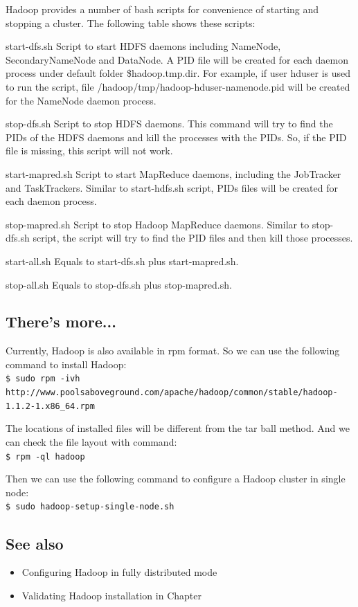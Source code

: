Hadoop provides a number of bash scripts for convenience of starting and stopping a cluster. The following table shows these scripts:
\begin{description}
    \item{start-dfs.sh} Script to start HDFS daemons including NameNode, SecondaryNameNode and DataNode. A PID file will be created for each daemon process under default folder \${hadoop.tmp.dir}. For example, if user hduser is used to run the script, file /hadoop/tmp/hadoop-hduser-namenode.pid will be created for the NameNode daemon process.
    \item{stop-dfs.sh} Script to stop HDFS daemons. This command will try to find the PIDs of the HDFS daemons and kill the processes with the PIDs. So, if the PID file is missing, this script will not work.
    \item{start-mapred.sh} Script to start MapReduce daemons, including the JobTracker and TaskTrackers. Similar to start-hdfs.sh script, PIDs files will be created for each daemon process.
    \item{stop-mapred.sh} Script to stop Hadoop MapReduce daemons. Similar to stop-dfs.sh script, the script will try to find the PID files and then kill those processes.
    \item{start-all.sh} Equals to start-dfs.sh plus start-mapred.sh.
    \item{stop-all.sh} Equals to stop-dfs.sh plus stop-mapred.sh.
\end{description}
\subsection*{There's more...}
Currently, Hadoop is also available in rpm format. So we can use the following command to install Hadoop: \\
\verb|$ sudo rpm -ivh http://www.poolsaboveground.com/apache/hadoop/common/stable/hadoop-1.1.2-1.x86_64.rpm|

The locations of installed files will be different from the tar ball method. And we can check the file layout with command: \\
\verb|$ rpm -ql hadoop|

Then we can use the following command to configure a Hadoop cluster in single node: \\
\verb|$ sudo hadoop-setup-single-node.sh|
\subsection*{See also}
\begin{itemize}
  \item Configuring Hadoop in fully distributed mode
  \item Validating Hadoop installation in Chapter
\end{itemize}


